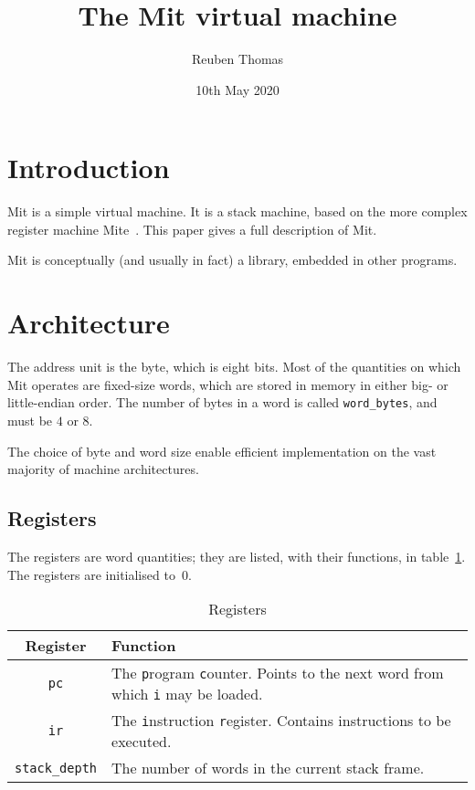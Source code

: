 \documentclass[a4paper]{article}
\title{The Mit virtual machine}
\author{Reuben Thomas}
\date{10th May 2020}
\begin{document}
\maketitle

\section{Introduction}

Mit is a simple virtual machine. It is a stack machine, based on the more complex register machine Mite~\cite{mite0}.
This paper gives a full description of Mit.

Mit is conceptually (and usually in fact) a library, embedded in other programs.


\section{Architecture}

The address unit is the byte, which is eight bits.
Most of the quantities on which Mit operates are fixed-size words, which are stored in memory in either big- or little-endian order. The number of bytes in a word is called {\tt word\_bytes}, and must be $4$ or $8$.

The choice of byte and word size enable efficient implementation on the vast majority of machine architectures.


\subsection{Registers}
\label{registers}

The registers are word quantities; they are listed, with their functions, in table~\ref{regtable}. The registers are initialised to~$0$.

\begin{table}[htbp]
\begin{center}
\begin{tabular}{cp{3.75in}} \toprule
\bf Register & \bf Function \\
 \midrule
{\tt pc} & The {\tt p}rogram {\tt c}ounter. Points to the next word from which {\tt i} may be loaded. \\
{\tt ir} & The {\tt i}nstruction {\tt r}egister. Contains instructions to be executed. \\
{\tt stack\_depth} & The number of words in the current stack frame. \\
 \bottomrule
\end{tabular}
\caption{\label{regtable}Registers}
\end{center}
\end{table}
\end{document}
